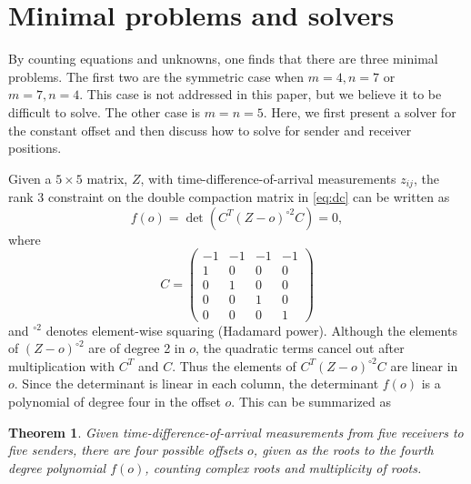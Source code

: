 \documentclass{article}
\newtheorem{theorem}{\noindent \textbf{Theorem}}
\begin{document}
\vspace{-5pt}
\section{Minimal problems and solvers}
\label{sec:minimal}
\vspace{-5pt}
By counting equations and unknowns, one finds that there are three minimal problems. The first two are the symmetric case when $m=4, n=7$ or $m=7, n=4$. This case is not addressed in this paper, but we believe it to be difficult to solve. The other case is $m=n= 5$. Here, we first present a solver for the constant offset and then discuss how to solve for sender and receiver positions. 


Given a $5 \times 5$ matrix, $Z$, with time-difference-of-arrival measurements $z_{ij}$, the rank $3$ constraint on the double compaction matrix in \eqref{eq:dc} 
can be written as
\begin{equation}
f(o) = \det ( C^T (Z-o)^{\circ 2} C )  = 0, 
\end{equation}
where
\begin{equation}
C = \begin{pmatrix}
-1 & -1 & -1 & -1\\
1 & 0 & 0 & 0\\
0  & 1 & 0 & 0\\
0 & 0 & 1 & 0 \\
0 & 0 & 0 & 1 
\end{pmatrix} 
\end{equation}
and $^{\circ 2}$ denotes element-wise squaring (Hadamard power).
Although the elements of $ (Z-o)^{\circ 2}$ are of degree 2 in $o$, the quadratic terms cancel out after multiplication with $C^T$ and $C$. Thus the elements of $C^T (Z-o)^{\circ 2} C$ are linear in $o$.
Since the determinant is linear in each column, the determinant $f(o)$ is a polynomial of degree four in the offset $o$. This can be summarized as 
\begin{theorem}
Given time-difference-of-arrival measurements from five receivers to five senders, there are four possible offsets $o$, given as the roots to the fourth degree polynomial $f(o)$, counting complex roots and multiplicity of roots. 
\end{theorem}
 
\end{document}

